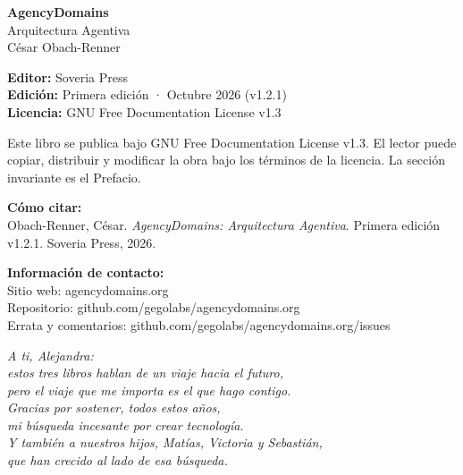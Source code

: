 \clearpage
\thispagestyle{empty}
\vspace*{2cm}

\noindent\textbf{AgencyDomains}\\
Arquitectura Agentiva\\
César Obach-Renner

\vspace{1cm}

\noindent\textbf{Editor:} Soveria Press\\
\textbf{Edición:} Primera edición · Octubre 2026 (v1.2.1)\\
\textbf{Licencia:} GNU Free Documentation License v1.3

\vspace{1cm}

\noindent Este libro se publica bajo GNU Free Documentation License v1.3. El lector puede copiar, distribuir y modificar la obra bajo los términos de la licencia. La sección invariante es el Prefacio.

\vspace{0.8cm}

\noindent\textbf{Cómo citar:}\\
Obach-Renner, César. \emph{AgencyDomains: Arquitectura Agentiva}. Primera edición v1.2.1. Soveria Press, 2026.

\vspace{0.8cm}

\noindent\textbf{Información de contacto:}\\
Sitio web: agencydomains.org\\
Repositorio: github.com/gegolabs/agencydomains.org\\
Errata y comentarios: github.com/gegolabs/agencydomains.org/issues

\vfill

\clearpage
\thispagestyle{empty}
\vspace*{\fill}
\begin{center}
\textit{A ti, Alejandra:\\
estos tres libros hablan de un viaje hacia el futuro,\\
pero el viaje que me importa es el que hago contigo.\\
Gracias por sostener, todos estos años,\\
mi búsqueda incesante por crear tecnología.\\[0.8em]
Y también a nuestros hijos, Matías, Victoria y Sebastián,\\
que han crecido al lado de esa búsqueda.}
\end{center}
\vspace*{\fill}
\clearpage
